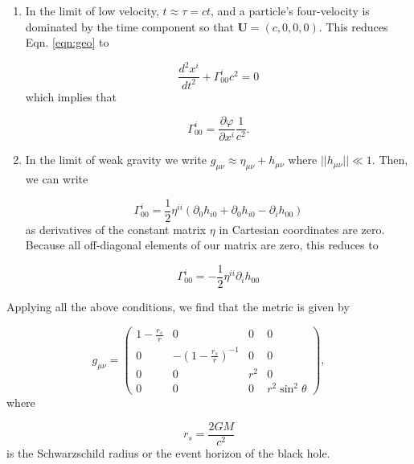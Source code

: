 \documentclass{CUP-JNL-DTM}%
\theoremstyle{definition}
\numberwithin{equation}{section}
\begin{document}
\begin{enumerate}
\item In the limit of low velocity, $t \approx \tau = ct$, and a particle's four-velocity is dominated by the time component so that $\textbf{U} = (c,0,0,0)$. This reduces Eqn. \ref{eqn:geo} to 

\begin{equation}
     \frac{d^2x^i}{dt^2} + \Gamma^i_{00}c^2 = 0
     \label{eqn:geo_low_v}
\end{equation}
which implies that 

\begin{equation}
    \Gamma^i_{00} = \frac{\partial \varphi}{\partial x^i}\frac{1}{c^2}. 
\end{equation}

\item In the limit of weak gravity we write $g_{\mu\nu} \approx \eta_{\mu\nu} + h_{\mu\nu}$ where $||h_{\mu\nu}|| \ll 1$. Then, we can write 

\begin{equation}
    \Gamma^i_{00} = \frac{1}{2}\eta^{ii}(\partial_0 h_{i0} + \partial_0h_{i0} - \partial_i h_{00})
\end{equation}
as derivatives of the constant matrix $\eta$ in Cartesian coordinates are zero. Because all off-diagonal elements of our matrix are zero, this reduces to 

\begin{equation}
    \Gamma^i_{00} = -\frac{1}{2}\eta^{ii}\partial_i h_{00}
\end{equation}

\end{enumerate}

Applying all the above conditions, we find that the metric is given by

\begin{equation}
    g_{\mu\nu} = \begin{pmatrix}
        1 - \frac{r_s}{r} & 0 & 0 & 0 \\
        0 & -(1 - \frac{r_s}{r})^{-1} & 0 & 0 \\
        0 & 0 & r^2 & 0 \\
        0 & 0 & 0 & r^2\sin^2\theta
    \end{pmatrix},
\end{equation}
where 

\begin{equation}
    r_s = \frac{2GM}{c^2}
\end{equation}
is the Schwarzschild radius or the event horizon of the black hole. 
\end{document}
